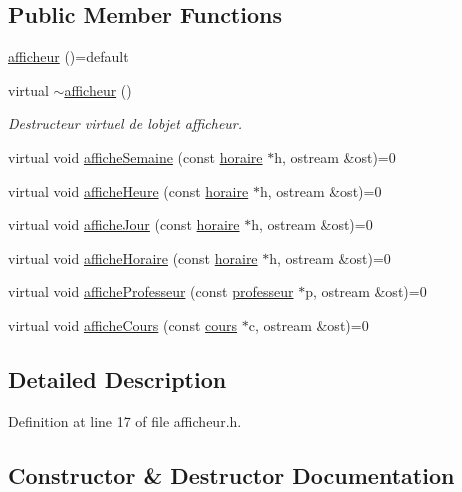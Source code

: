 \subsection*{Public Member Functions}
\begin{DoxyCompactItemize}
\item 
\hyperlink{classafficheur_a6bc02ed7b0dbbb21607528ae03c4f886}{afficheur} ()=default
\item 
virtual \hyperlink{classafficheur_a093c44d15f6de24883abce836bfd11c9}{$\sim$afficheur} ()
\begin{DoxyCompactList}\small\item\em Destructeur virtuel de l\textquotesingle{}objet afficheur. \end{DoxyCompactList}\item 
virtual void \hyperlink{classafficheur_a1551534b5916a48d3ea73f0d68929e95}{affiche\+Semaine} (const \hyperlink{classhoraire}{horaire} $\ast$h, ostream \&ost)=0
\item 
virtual void \hyperlink{classafficheur_a3c3ace0f2f01e95a1cc86a0b6c497e34}{affiche\+Heure} (const \hyperlink{classhoraire}{horaire} $\ast$h, ostream \&ost)=0
\item 
virtual void \hyperlink{classafficheur_a0cea335dad556ceba3487ae261b831f9}{affiche\+Jour} (const \hyperlink{classhoraire}{horaire} $\ast$h, ostream \&ost)=0
\item 
virtual void \hyperlink{classafficheur_aa598626f11775b4c610b8f262017cad7}{affiche\+Horaire} (const \hyperlink{classhoraire}{horaire} $\ast$h, ostream \&ost)=0
\item 
virtual void \hyperlink{classafficheur_a54b3e457d56738ed20641e5546872142}{affiche\+Professeur} (const \hyperlink{classprofesseur}{professeur} $\ast$p, ostream \&ost)=0
\item 
virtual void \hyperlink{classafficheur_a9d176576ad45c2a07a8a887b853b7edb}{affiche\+Cours} (const \hyperlink{classcours}{cours} $\ast$c, ostream \&ost)=0
\end{DoxyCompactItemize}


\subsection{Detailed Description}


Definition at line 17 of file afficheur.\+h.



\subsection{Constructor \& Destructor Documentation}
\hypertarget{classafficheur_a6bc02ed7b0dbbb21607528ae03c4f886}{}\label{classafficheur_a6bc02ed7b0dbbb21607528ae03c4f886} 
